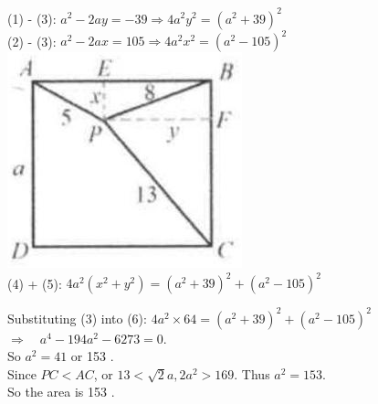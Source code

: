 \documentclass{article}
\begin{document}
(1) - (3): \(a^{2}-2 a y=-39 \Rightarrow 4 a^{2} y^{2}=\left(a^{2}+39\right)^{2}\)\\
(2) - (3): \(a^{2}-2 a x=105 \Rightarrow 4 a^{2} x^{2}=\left(a^{2}-105\right)^{2}\)\\
\centering
\includegraphics[width=\textwidth]{images/reasoning_image_1.jpg}\\
(4) + (5): \(4 a^{2}\left(x^{2}+y^{2}\right)=\left(a^{2}+39\right)^{2}+\left(a^{2}-105\right)^{2}\)

Substituting (3) into (6): \(4 a^{2} \times 64=\left(a^{2}+39\right)^{2}+\left(a^{2}-105\right)^{2}\)\\
\(\Rightarrow \quad a^{4}-194 a^{2}-6273=0\).\\
So \(a^{2}=41\) or 153 .\\
Since \(P C<A C\), or \(13<\sqrt{2} a, 2 a^{2}>169\). Thus \(a^{2}=153\).\\
So the area is 153 .\\
\end{document}
